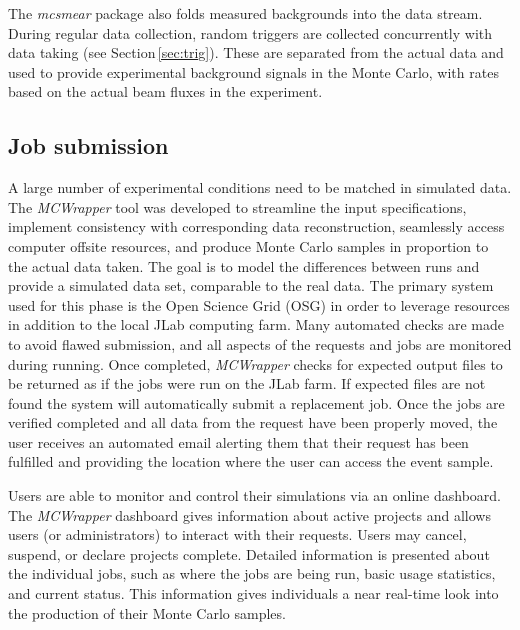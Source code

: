 The \textit{mcsmear} package also folds measured backgrounds into the data stream. During regular data collection, random triggers are collected concurrently with data taking (see Section\,\ref{sec:trig}). These are separated from the actual data and used to provide experimental background signals in the Monte Carlo, with rates based on the actual beam fluxes in the experiment. 

\subsection{Job submission \label{sec:jobsubmission}}
A large number of experimental conditions need to be matched in simulated data. The \emph{MCWrapper} tool was 
developed to streamline the input specifications, implement consistency with corresponding data reconstruction, seamlessly access computer offsite resources, and produce Monte Carlo samples in proportion to the actual data taken. The goal is to model the differences between runs and provide a simulated data set, comparable to the real data. The primary system used for this phase is the Open Science Grid (OSG) in order to leverage resources in addition to the local JLab computing farm. Many automated checks are made to avoid flawed submission, and all aspects of the requests and jobs are monitored during running. Once completed, \emph{MCWrapper} checks for expected output files to be returned as if the jobs were run on the JLab farm. If expected files are not found the system will automatically submit a replacement job. Once the jobs are verified completed and all data from the request have been properly moved, the user receives an automated email alerting them that their request has been fulfilled and providing the location where the user can access the event sample.

Users are able to monitor and control their simulations via an online dashboard. The \emph{MCWrapper} dashboard gives information about active projects and allows users (or administrators) to interact with their requests. Users may cancel, suspend, or declare projects complete. Detailed information is presented about the individual jobs, such as where the jobs are being run, basic usage statistics, and current status.  This information gives individuals a near real-time look into the production of their Monte Carlo samples.


